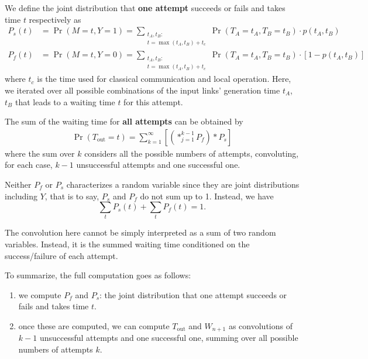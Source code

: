 \documentclass{masterthesis}
\begin{document}
We define the joint distribution that \textbf{one attempt} succeeds or fails and takes time $t$ respectively as
\begin{align}\label{eq:waiting_time_success_failure}
    P_s(t) &= \Pr(M = t, Y = 1) = \sum_{\substack{t_A, t_B : \\ t = \max(t_A, t_B) + t_c}} \Pr(T_A = t_A, T_B = t_B) \cdot p(t_A, t_B) \\
    P_f(t) &= \Pr(M = t, Y = 0) = \sum_{\substack{t_A, t_B : \\ t = \max(t_A, t_B) + t_c}} \Pr(T_A = t_A, T_B = t_B) \cdot [1 - p(t_A, t_B)]
\end{align}
where $t_c$ is the time used for classical communication and local operation. Here, we iterated over all possible combinations of the input links' generation time $t_A$, $t_B$ that leads to a waiting time $t$ for this attempt.

The sum of the waiting time for \textbf{all attempts} can be obtained by
\begin{align}\label{eq:waiting_time_distillation}
    \Pr(T_\text{out} = t) = \sum_{k=1}^{\infty} \left[ \left( \ast_{j=1}^{k-1} P_f \right) \ast P_s \right]
\end{align}
where the sum over $k$ considers all the possible numbers of attempts, convoluting, for each case, $k-1$ unsuccessful attempts and one successful one.

Neither $P_f$ or $P_s$ characterizes a random variable since they are joint distributions including $Y$, that is to say, $P_s$ and $P_f$ do not sum up to 1. Instead, we have
\begin{equation}
    \sum_t P_s(t) + \sum_t P_f(t) = 1 .
\end{equation}

The convolution here cannot be simply interpreted as a sum of two random variables. Instead, it is the summed waiting time conditioned on the success/failure of each attempt.

To summarize, the full computation goes as follows:
\begin{enumerate}
    \item we compute $P_f$ and $P_s$: the joint distribution that one attempt succeeds or fails and takes time $t$.
    \item once these are computed, we can compute $T_\text{out}$ and $W_{n+1}$ as convolutions of $k-1$ unsuccessful attempts and one successful one, summing over all possible numbers of attempts $k$.
\end{enumerate}
\end{document}
